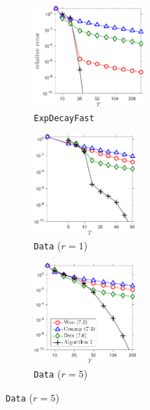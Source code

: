 \documentclass[final]{siamart1116}
\numberwithin{equation}{section}
\numberwithin{theorem}{section}
\numberwithin{figure}{section}
\begin{document}
\begin{figure}[htp!]
\begin{center}
\begin{subfigure}{.325\textwidth}
\begin{center}
\includegraphics[height=1.5in]{figures/EFAST_Frobenius.pdf}
\caption{\texttt{ExpDecayFast}}
\label{fig:EFAST-algs}
\end{center}
\end{subfigure}
\begin{subfigure}{.325\textwidth}
\begin{center}
\includegraphics[height=1.5in]{figures/DATA1_Frobenius.pdf}
\caption{\texttt{Data} ($r = 1$)}
\label{fig:DATA1-algs}
\end{center}
\end{subfigure}
\begin{subfigure}{.325\textwidth}
\begin{center}
\includegraphics[height=1.5in]{figures/DATA5_Frobenius.pdf}
\caption{\texttt{Data} ($r = 5$)}
\label{fig:DATA5-algs}
\end{center}
\end{subfigure}
\end{center}

\vspace{0.5em}


\end{figure}
\end{document}
